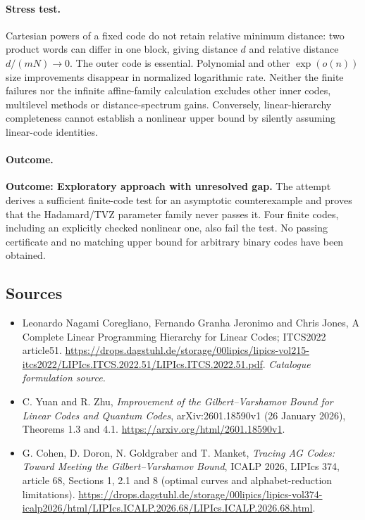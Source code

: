 \documentclass[11pt,a4paper]{article}
\numberwithin{equation}{section}
\begin{document}
\paragraph{Stress test.}
Cartesian powers of a fixed code do not retain relative minimum distance:
two product words can differ in one block, giving distance $d$ and relative
distance $d/(mN)\to0$. The outer code is essential. Polynomial and other
$\exp(o(n))$ size improvements disappear in normalized logarithmic rate.
Neither the finite failures nor the infinite affine-family calculation
excludes other inner codes, multilevel methods or distance-spectrum gains.
Conversely, linear-hierarchy completeness cannot establish a nonlinear
upper bound by silently assuming linear-code identities.

\paragraph{Outcome.}
\textbf{Outcome: Exploratory approach with unresolved gap.}
The attempt derives a sufficient finite-code test for an asymptotic
counterexample and proves that the Hadamard/TVZ parameter family never
passes it. Four finite codes, including an explicitly checked nonlinear
one, also fail the test. No passing certificate and no matching upper bound
for arbitrary binary codes have been obtained.

\subsection{Sources}
\begin{itemize}\raggedright
\item[\textnormal{[S1]}]\hypertarget{source:statement:1}{} Leonardo Nagami Coregliano, Fernando Granha Jeronimo and Chris Jones, A Complete Linear Programming Hierarchy for Linear Codes; ITCS2022 article51.
\url{https://drops.dagstuhl.de/storage/00lipics/lipics-vol215-itcs2022/LIPIcs.ITCS.2022.51/LIPIcs.ITCS.2022.51.pdf}.
{\small\textit{Catalogue formulation source.}}
\item[\textnormal{[E1]}]\hypertarget{extra:statement:1}{} C. Yuan and R. Zhu,
\emph{Improvement of the Gilbert--Varshamov Bound for Linear Codes and Quantum
Codes}, arXiv:2601.18590v1 (26 January 2026), Theorems 1.3 and 4.1.
\url{https://arxiv.org/html/2601.18590v1}.
\item[\textnormal{[E2]}]\hypertarget{extra:statement:2}{} G. Cohen, D. Doron,
N. Goldgraber and T. Manket, \emph{Tracing AG Codes: Toward Meeting the
Gilbert--Varshamov Bound}, ICALP 2026, LIPIcs 374, article 68, Sections 1,
2.1 and 8 (optimal curves and alphabet-reduction limitations).
\url{https://drops.dagstuhl.de/storage/00lipics/lipics-vol374-icalp2026/html/LIPIcs.ICALP.2026.68/LIPIcs.ICALP.2026.68.html}.

\end{itemize}
\end{document}
